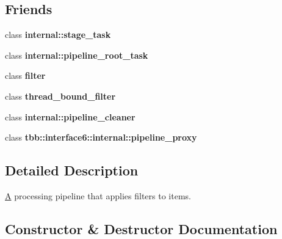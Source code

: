 \subsection*{Friends}
\begin{DoxyCompactItemize}
\item 
\hypertarget{classtbb_1_1pipeline_a88bd11ed4d74f6de43a7d3b0bc05f2c3}{}class {\bfseries internal\+::stage\+\_\+task}\label{classtbb_1_1pipeline_a88bd11ed4d74f6de43a7d3b0bc05f2c3}

\item 
\hypertarget{classtbb_1_1pipeline_aa6f9dcf41617866d7bf0e72d8efc11e7}{}class {\bfseries internal\+::pipeline\+\_\+root\+\_\+task}\label{classtbb_1_1pipeline_aa6f9dcf41617866d7bf0e72d8efc11e7}

\item 
\hypertarget{classtbb_1_1pipeline_adcddbbe2df37193795a145ef8aac7954}{}class {\bfseries filter}\label{classtbb_1_1pipeline_adcddbbe2df37193795a145ef8aac7954}

\item 
\hypertarget{classtbb_1_1pipeline_ab4463cf8612c362ee109224e45fad104}{}class {\bfseries thread\+\_\+bound\+\_\+filter}\label{classtbb_1_1pipeline_ab4463cf8612c362ee109224e45fad104}

\item 
\hypertarget{classtbb_1_1pipeline_a39b28579343dc2cdb67fe3fbffe731a8}{}class {\bfseries internal\+::pipeline\+\_\+cleaner}\label{classtbb_1_1pipeline_a39b28579343dc2cdb67fe3fbffe731a8}

\item 
\hypertarget{classtbb_1_1pipeline_a0307e203ca37529138734040c3881a35}{}class {\bfseries tbb\+::interface6\+::internal\+::pipeline\+\_\+proxy}\label{classtbb_1_1pipeline_a0307e203ca37529138734040c3881a35}

\end{DoxyCompactItemize}


\subsection{Detailed Description}
\hyperlink{structA}{A} processing pipeline that applies filters to items. 



\subsection{Constructor \& Destructor Documentation}
\hypertarget{classtbb_1_1pipeline_a43f858ac5f66cad39aca62f6e0de7713}{}
